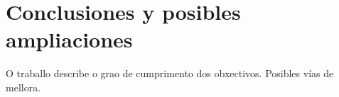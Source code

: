 \chapter{Conclusiones y posibles ampliaciones}

O traballo describe o grao de cumprimento dos obxectivos. Posibles vías de mellora.
